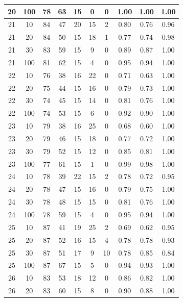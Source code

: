 \begin{longtable}{ |c|c|c|c|c|c|c|c|c|c| }
            20 & 100 & 78 & 63 & 15 & 0 & 0 & 1.00 & 1.00 & 1.00 \\ \hline
            21 & 10 & 84 & 47 & 20 & 15 & 2 & 0.80 & 0.76 & 0.96 \\ \hline
            21 & 20 & 84 & 50 & 15 & 18 & 1 & 0.77 & 0.74 & 0.98 \\ \hline
            21 & 30 & 83 & 59 & 15 & 9 & 0 & 0.89 & 0.87 & 1.00 \\ \hline
            21 & 100 & 81 & 62 & 15 & 4 & 0 & 0.95 & 0.94 & 1.00 \\ \hline
            22 & 10 & 76 & 38 & 16 & 22 & 0 & 0.71 & 0.63 & 1.00 \\ \hline
            22 & 20 & 75 & 44 & 15 & 16 & 0 & 0.79 & 0.73 & 1.00 \\ \hline
            22 & 30 & 74 & 45 & 15 & 14 & 0 & 0.81 & 0.76 & 1.00 \\ \hline
            22 & 100 & 74 & 53 & 15 & 6 & 0 & 0.92 & 0.90 & 1.00 \\ \hline
            23 & 10 & 79 & 38 & 16 & 25 & 0 & 0.68 & 0.60 & 1.00 \\ \hline
            23 & 20 & 79 & 46 & 15 & 18 & 0 & 0.77 & 0.72 & 1.00 \\ \hline
            23 & 30 & 79 & 52 & 15 & 12 & 0 & 0.85 & 0.81 & 1.00 \\ \hline
            23 & 100 & 77 & 61 & 15 & 1 & 0 & 0.99 & 0.98 & 1.00 \\ \hline
            24 & 10 & 78 & 39 & 22 & 15 & 2 & 0.78 & 0.72 & 0.95 \\ \hline
            24 & 20 & 78 & 47 & 15 & 16 & 0 & 0.79 & 0.75 & 1.00 \\ \hline
            24 & 30 & 78 & 48 & 15 & 15 & 0 & 0.81 & 0.76 & 1.00 \\ \hline
            24 & 100 & 78 & 59 & 15 & 4 & 0 & 0.95 & 0.94 & 1.00 \\ \hline
            25 & 10 & 87 & 41 & 19 & 25 & 2 & 0.69 & 0.62 & 0.95 \\ \hline
            25 & 20 & 87 & 52 & 16 & 15 & 4 & 0.78 & 0.78 & 0.93 \\ \hline
            25 & 30 & 87 & 51 & 17 & 9 & 10 & 0.78 & 0.85 & 0.84 \\ \hline
            25 & 100 & 87 & 67 & 15 & 5 & 0 & 0.94 & 0.93 & 1.00 \\ \hline
            26 & 10 & 83 & 53 & 18 & 12 & 0 & 0.86 & 0.82 & 1.00 \\ \hline
            26 & 20 & 83 & 60 & 15 & 8 & 0 & 0.90 & 0.88 & 1.00 \\ \hline

\end{longtable}
